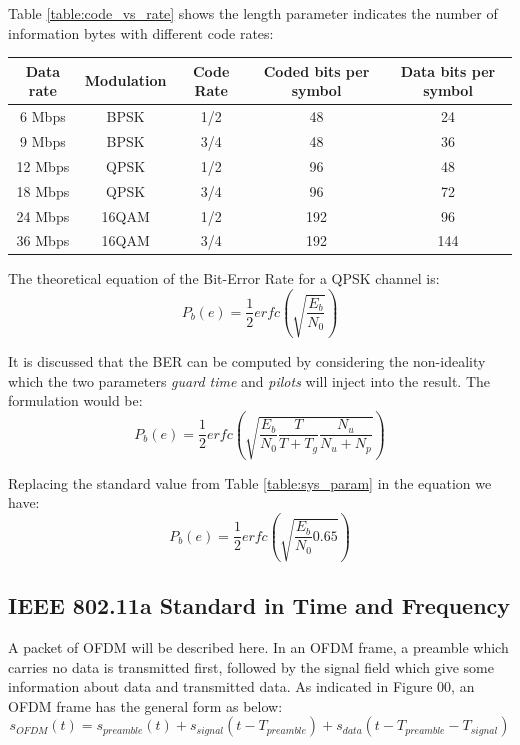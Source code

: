 Table \ref{table:code_vs_rate} shows the length parameter indicates the number of information bytes with different code rates:

\begin{center}
\label{table:code_vs_rate}
\vspace{0.5cm}
\begin{tabular}{c|c|c|c|c}
Data rate&Modulation&Code Rate&Coded bits per symbol&Data bits per symbol\\ \hline
6 Mbps&BPSK&1/2&48&24\\
9 Mbps&BPSK&3/4&48&36\\
12 Mbps&QPSK&1/2&96&48\\
18 Mbps&QPSK&3/4&96&72\\
24 Mbps&16QAM&1/2&192&96\\
36 Mbps&16QAM&3/4&192&144\\
\end{tabular}
\end{center}

The theoretical equation of the Bit-Error Rate for a QPSK channel is:\\

\begin{equation} \label{theo_ber}
P_{b}(e)= \dfrac{1}{2}erfc(\sqrt{\dfrac{E_{b}}{N_{0}}})
\end{equation}

It is discussed that the BER can be computed by considering the non-ideality which the two parameters \textit{guard time} and \textit{pilots} will inject into the result. The formulation would be:\\

\begin{equation} \label{theo_ber_guard_pilot}
P_{b}(e)= \dfrac{1}{2}erfc(\sqrt{\dfrac{E_{b}}{N_{0}}\dfrac{T}{T+T_{g}}\dfrac{N_{u}}{N_{u}+N_{p}}})
\end{equation}

Replacing the standard value from Table \ref{table:sys_param} in the equation we have:\\

\begin{equation} \label{theo_ber_ieee}
P_{b}(e)= \dfrac{1}{2}erfc(\sqrt{\dfrac{E_{b}}{N_{0}}0.65})
\end{equation}

\subsection{IEEE 802.11a Standard in Time and Frequency}
\label{section:ieee_standard}
A packet of OFDM will be described here. In an OFDM frame, a preamble which carries no data is transmitted first, followed by the signal field which give some information about data and transmitted data. As indicated in Figure 00, an OFDM frame has the general form as below:
\begin{equation} \label{sym_ofdm}
s_{OFDM}(t)= s_{preamble}(t)+ s_{signal}(t- T_{preamble})+ s_{data}(t- T_{preamble}- T_{signal})
\end{equation}

